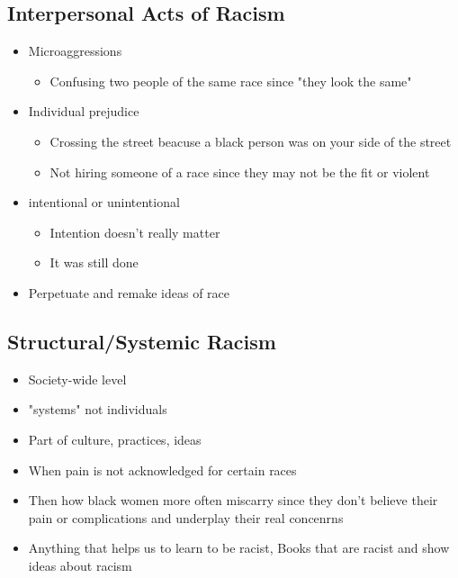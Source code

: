\documentclass{article}
\begin{document}
\subsection{Interpersonal Acts of Racism}
\begin{itemize}
  \item Microaggressions
\begin{itemize}
  \item Confusing two people of the same race since "they look the same"
\end{itemize}

\item Individual prejudice 
  \begin{itemize}
    \item Crossing the street beacuse a black person was on your side of the street
    \item Not hiring someone of a race since they may not be the fit or violent
  \end{itemize}

\item intentional or unintentional
  \begin{itemize}
    \item Intention doesn't really matter
    \item It was still done
  \end{itemize}
\item Perpetuate and remake ideas of race
\end{itemize}

\subsection{Structural/Systemic Racism}
\begin{itemize}
  \item Society-wide level
  \item "systems" not individuals
  \item Part of culture, practices, ideas
  \item When pain is not acknowledged for certain races
  \item Then how black women more often miscarry since they don't believe their pain or complications and underplay their real concenrns
  \item Anything that helps us to learn to be racist,
    Books that are racist and show ideas about racism
\end{itemize}
\end{document}
